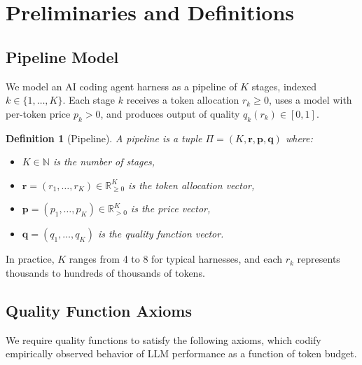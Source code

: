 \documentclass[11pt, a4paper, copyright]{googledeepmind}
\newtheorem{definition}{Definition}[section]
\begin{document}
\section{Preliminaries and Definitions}\label{sec:prelim}

\subsection{Pipeline Model}

We model an AI coding agent harness as a pipeline of $K$ stages, indexed $k \in \{1, \ldots, K\}$. Each stage $k$ receives a token allocation $r_k \geq 0$, uses a model with per-token price $p_k > 0$, and produces output of quality $q_k(r_k) \in [0, 1]$.

\begin{definition}[Pipeline]\label{def:pipeline}
A \emph{pipeline} is a tuple $\Pi = (K, \mathbf{r}, \mathbf{p}, \mathbf{q})$ where:
\begin{itemize}[nosep]
    \item $K \in \mathbb{N}$ is the number of stages,
    \item $\mathbf{r} = (r_1, \ldots, r_K) \in \mathbb{R}_{\geq 0}^K$ is the token allocation vector,
    \item $\mathbf{p} = (p_1, \ldots, p_K) \in \mathbb{R}_{> 0}^K$ is the price vector,
    \item $\mathbf{q} = (q_1, \ldots, q_K)$ is the quality function vector.
\end{itemize}
\end{definition}

In practice, $K$ ranges from 4 to 8 for typical harnesses, and each $r_k$ represents thousands to hundreds of thousands of tokens.

\subsection{Quality Function Axioms}

We require quality functions to satisfy the following axioms, which codify empirically observed behavior of LLM performance as a function of token budget.
\end{document}
